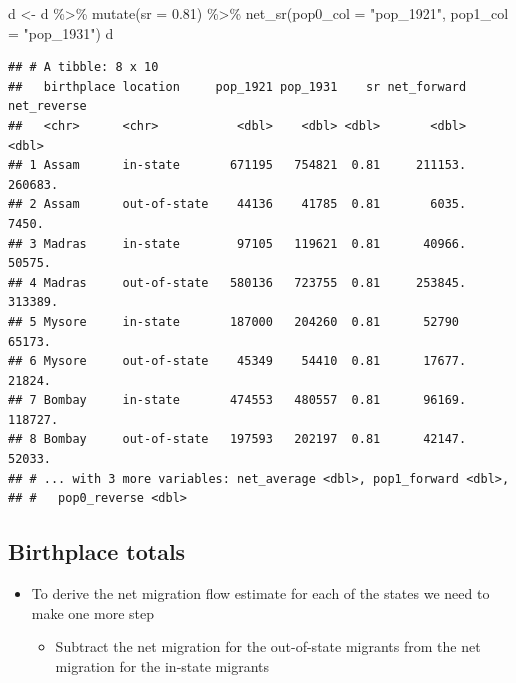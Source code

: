 \documentclass[
]{book}
\newenvironment{Shaded}{\begin{snugshade}}{\end{snugshade}}
\newcommand{\AttributeTok}[1]{\textcolor[rgb]{0.77,0.63,0.00}{#1}}
\newcommand{\FloatTok}[1]{\textcolor[rgb]{0.00,0.00,0.81}{#1}}
\newcommand{\FunctionTok}[1]{\textcolor[rgb]{0.00,0.00,0.00}{#1}}
\newcommand{\NormalTok}[1]{#1}
\newcommand{\OtherTok}[1]{\textcolor[rgb]{0.56,0.35,0.01}{#1}}
\newcommand{\SpecialCharTok}[1]{\textcolor[rgb]{0.00,0.00,0.00}{#1}}
\newcommand{\StringTok}[1]{\textcolor[rgb]{0.31,0.60,0.02}{#1}}
\providecommand{\tightlist}{%
  \setlength{\itemsep}{0pt}\setlength{\parskip}{0pt}}
\begin{document}
\begin{Shaded}
\begin{Highlighting}[]
\NormalTok{d }\OtherTok{\textless{}{-}}\NormalTok{ d }\SpecialCharTok{\%\textgreater{}\%}
  \FunctionTok{mutate}\NormalTok{(}\AttributeTok{sr =} \FloatTok{0.81}\NormalTok{) }\SpecialCharTok{\%\textgreater{}\%}
  \FunctionTok{net\_sr}\NormalTok{(}\AttributeTok{pop0\_col =} \StringTok{"pop\_1921"}\NormalTok{, }\AttributeTok{pop1\_col =} \StringTok{"pop\_1931"}\NormalTok{)}
\NormalTok{d}
\end{Highlighting}
\end{Shaded}

\begin{verbatim}
## # A tibble: 8 x 10
##   birthplace location     pop_1921 pop_1931    sr net_forward net_reverse
##   <chr>      <chr>           <dbl>    <dbl> <dbl>       <dbl>       <dbl>
## 1 Assam      in-state       671195   754821  0.81     211153.     260683.
## 2 Assam      out-of-state    44136    41785  0.81       6035.       7450.
## 3 Madras     in-state        97105   119621  0.81      40966.      50575.
## 4 Madras     out-of-state   580136   723755  0.81     253845.     313389.
## 5 Mysore     in-state       187000   204260  0.81      52790       65173.
## 6 Mysore     out-of-state    45349    54410  0.81      17677.      21824.
## 7 Bombay     in-state       474553   480557  0.81      96169.     118727.
## 8 Bombay     out-of-state   197593   202197  0.81      42147.      52033.
## # ... with 3 more variables: net_average <dbl>, pop1_forward <dbl>,
## #   pop0_reverse <dbl>
\end{verbatim}

\hypertarget{birthplace-totals-5}{%
\subsection{Birthplace totals}\label{birthplace-totals-5}}

\begin{itemize}
\tightlist
\item
  To derive the net migration flow estimate for each of the states we need to make one more step

  \begin{itemize}
  \tightlist
  \item
    Subtract the net migration for the out-of-state migrants from the net migration for the in-state migrants
  \end{itemize}
\end{itemize}
\end{document}
